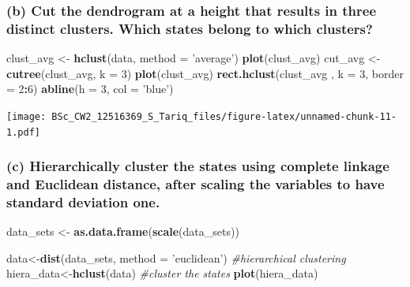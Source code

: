 \documentclass[]{article}
\newenvironment{Shaded}{\begin{snugshade}}{\end{snugshade}}
\newcommand{\CommentTok}[1]{\textcolor[rgb]{0.56,0.35,0.01}{\textit{#1}}}
\newcommand{\DataTypeTok}[1]{\textcolor[rgb]{0.13,0.29,0.53}{#1}}
\newcommand{\DecValTok}[1]{\textcolor[rgb]{0.00,0.00,0.81}{#1}}
\newcommand{\KeywordTok}[1]{\textcolor[rgb]{0.13,0.29,0.53}{\textbf{#1}}}
\newcommand{\NormalTok}[1]{#1}
\newcommand{\OperatorTok}[1]{\textcolor[rgb]{0.81,0.36,0.00}{\textbf{#1}}}
\newcommand{\StringTok}[1]{\textcolor[rgb]{0.31,0.60,0.02}{#1}}
\begin{document}
\hypertarget{b-cut-the-dendrogram-at-a-height-that-results-in-three-distinct-clusters.-which-states-belong-to-which-clusters}{%
\subsubsection{(b) Cut the dendrogram at a height that results in three
distinct clusters. Which states belong to which
clusters?}\label{b-cut-the-dendrogram-at-a-height-that-results-in-three-distinct-clusters.-which-states-belong-to-which-clusters}}

\begin{Shaded}
\begin{Highlighting}[]
\NormalTok{clust_avg <-}\StringTok{ }\KeywordTok{hclust}\NormalTok{(data, }\DataTypeTok{method =} \StringTok{'average'}\NormalTok{)}
\KeywordTok{plot}\NormalTok{(clust_avg)}
\NormalTok{cut_avg <-}\StringTok{ }\KeywordTok{cutree}\NormalTok{(clust_avg, }\DataTypeTok{k =} \DecValTok{3}\NormalTok{)}
\KeywordTok{plot}\NormalTok{(clust_avg)}
\KeywordTok{rect.hclust}\NormalTok{(clust_avg , }\DataTypeTok{k =} \DecValTok{3}\NormalTok{, }\DataTypeTok{border =} \DecValTok{2}\OperatorTok{:}\DecValTok{6}\NormalTok{)}
\KeywordTok{abline}\NormalTok{(}\DataTypeTok{h =} \DecValTok{3}\NormalTok{, }\DataTypeTok{col =} \StringTok{'blue'}\NormalTok{)}
\end{Highlighting}
\end{Shaded}

\texttt{[image: BSc\_CW2\_12516369\_S\_Tariq\_files/figure-latex/unnamed-chunk-11-1.pdf]}

\hypertarget{c-hierarchically-cluster-the-states-using-complete-linkage-and-euclidean-distance-after-scaling-the-variables-to-have-standard-deviation-one.}{%
\subsubsection{(c) Hierarchically cluster the states using complete
linkage and Euclidean distance, after scaling the variables to have
standard deviation
one.}\label{c-hierarchically-cluster-the-states-using-complete-linkage-and-euclidean-distance-after-scaling-the-variables-to-have-standard-deviation-one.}}

\begin{Shaded}
\begin{Highlighting}[]
\NormalTok{data_sets <-}\StringTok{ }\KeywordTok{as.data.frame}\NormalTok{(}\KeywordTok{scale}\NormalTok{(data_sets))}

\NormalTok{data<-}\KeywordTok{dist}\NormalTok{(data_sets, }\DataTypeTok{method =} \StringTok{'euclidean'}\NormalTok{)}
\CommentTok{#hierarchical clustering}
\NormalTok{hiera_data<-}\KeywordTok{hclust}\NormalTok{(data)}
\CommentTok{#cluster the states}
\KeywordTok{plot}\NormalTok{(hiera_data)}
\end{Highlighting}
\end{Shaded}
\end{document}
